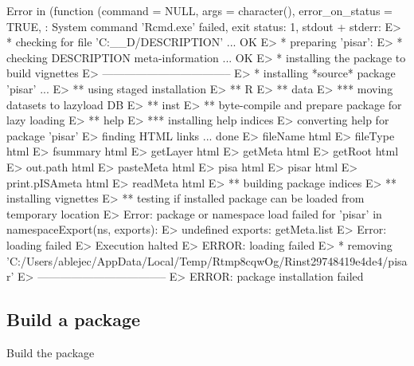\documentclass[a4paper,12pt]{article}\usepackage[]{graphicx}\usepackage[]{color}
\begin{document}
\begin{Schunk}
\begin{Soutput}
\end{Soutput}
\begin{Soutput}
Error in (function (command = NULL, args = character(), error_on_status = TRUE, : System command 'Rcmd.exe' failed, exit status: 1, stdout + stderr:
E> * checking for file 'C:\__D\OMIKE\pisar/DESCRIPTION' ... OK
E> * preparing 'pisar':
E> * checking DESCRIPTION meta-information ... OK
E> * installing the package to build vignettes
E>       -----------------------------------
E> * installing *source* package 'pisar' ...
E> ** using staged installation
E> ** R
E> ** data
E> *** moving datasets to lazyload DB
E> ** inst
E> ** byte-compile and prepare package for lazy loading
E> ** help
E> *** installing help indices
E>   converting help for package 'pisar'
E>     finding HTML links ... done
E>     fileName                                html  
E>     fileType                                html  
E>     fsummary                                html  
E>     getLayer                                html  
E>     getMeta                                 html  
E>     getRoot                                 html  
E>     out.path                                html  
E>     pasteMeta                               html  
E>     pisa                                    html  
E>     pisar                                   html  
E>     print.pISAmeta                          html  
E>     readMeta                                html  
E> ** building package indices
E> ** installing vignettes
E> ** testing if installed package can be loaded from temporary location
E> Error: package or namespace load failed for 'pisar' in namespaceExport(ns, exports):
E>  undefined exports: getMeta.list
E> Error: loading failed
E> Execution halted
E> ERROR: loading failed
E> * removing 'C:/Users/ablejec/AppData/Local/Temp/Rtmp8cqwOg/Rinst29748419e4de4/pisar'
E>       -----------------------------------
E> ERROR: package installation failed
\end{Soutput}
\end{Schunk}
\clearpage
\subsection{Build a package}

Build the package
\end{document}
